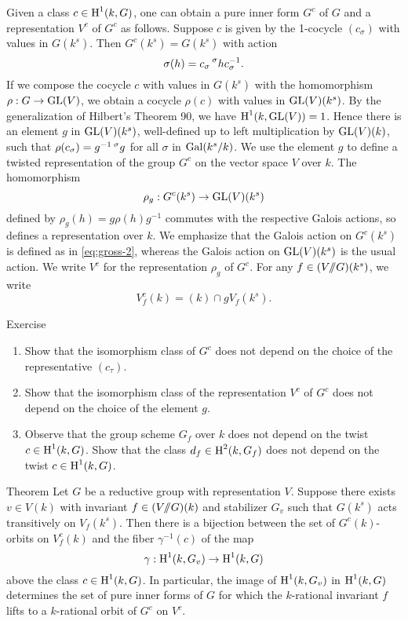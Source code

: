 Given a class $c\in \operatorname{H}^1(k,G)$, one can obtain a pure inner form $G^c$ of $G$ 
and a representation $V^c$ of $G^c$ as follows. Suppose $c$ is given by the 
1-cocycle $(c_\sigma)$ with values in $G(k^s)$. Then $G^c(k^s) = G(k^s)$ with 
action 
\begin{equation}\label{eq:gross-2}
  \sigma(h) = c_\sigma \prescript{\sigma}{}{h} c_\sigma^{-1} .
\end{equation}
If we compose the cocycle $c$ with values in $G(k^s)$ with the homomorphism 
$\rho:G\to \operatorname{GL}(V)$, we obtain a cocycle $\rho(c)$ with values in 
$\operatorname{GL}(V)(k^s)$. By the generalization of Hilbert's Theorem 90, we 
have $\operatorname{H}^1(k,\operatorname{GL}(V))=1$. Hence there is an element $g$ in 
$\operatorname{GL}(V)(k^s)$, well-defined up to left multiplication by 
$\operatorname{GL}(V)(k)$, such that 
$\rho(c_\sigma)=g^{-1}\prescript{\sigma}{}{g}$ for all $\sigma$ in 
$\operatorname{Gal}(k^s/k)$. We use the element $g$ to define a twisted representation of 
the group $G^c$ on the vector space $V$ over $k$. The homomorphism 
\[
  \rho_g:G^c(k^s) \to \operatorname{GL}(V)(k^s) 
\]
defined by $\rho_g(h)=g \rho(h) g^{-1}$ commutes with the respective Galois 
actions, so defines a representation over $k$. We emphasize that the Galois 
action on $G^c(k^s)$ is defined as in \eqref{eq:gross-2}, whereas the Galois 
action on $\operatorname{GL}(V)(k^s)$ is the usual action. We write $V^c$ for the 
representation $\rho_g$ of $G^c$. For any $f\in (V/\!\!/ G)(k^s)$, we write 
\[
  V_f^c(k) = (k)\cap g V_f(k^s) .
\]

\begin{enonce*}[remark]{Exercise}
\begin{enumerate}
  \item Show that the isomorphism class of $G^c$ does not depend on the choice 
    of the representative $(c_\tau)$. 
  \item Show that the isomorphism class of the representation $V^c$ of $G^c$ 
    does not depend on the choice of the element $g$. 
  \item Observe that the group scheme $G_f$ over $k$ does not depend on the 
    twist $c\in \operatorname{H}^1(k,G)$. Show that the class $d_f\in \operatorname{H}^2(k,G_f)$ does not 
    depend on the twist $c\in \operatorname{H}^1(k,G)$. 
\end{enumerate}
\end{enonce*}

\begin{enonce*}{Theorem}
Let $G$ be a reductive group with representation $V$. Suppose there exists 
$v\in V(k)$ with invariant $f\in (V/\!\!/ G)(k)$ and stabilizer $G_v$ such that 
$G(k^s)$ acts transitively on $V_f(k^s)$. Then there is a bijection between the 
set of $G^c(k)$-orbits on $V_f^c(k)$ and the fiber $\gamma^{-1}(c)$ of the map 
\[
  \gamma:\operatorname{H}^1(k,G_v) \to \operatorname{H}^1(k,G) 
\]
above the class $c\in \operatorname{H}^1(k,G)$. In particular, the image of $\operatorname{H}^1(k,G_v)$ in 
$\operatorname{H}^1(k,G)$ determines the set of pure inner forms of $G$ for which the 
$k$-rational invariant $f$ lifts to a $k$-rational orbit of $G^c$ on $V^c$. 
\end{enonce*}

